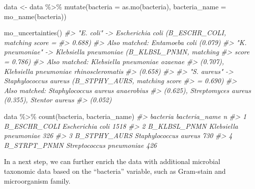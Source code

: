 \documentclass[
]{book}
\newenvironment{Shaded}{\begin{snugshade}}{\end{snugshade}}
\newcommand{\AttributeTok}[1]{\textcolor[rgb]{0.77,0.63,0.00}{#1}}
\newcommand{\CommentTok}[1]{\textcolor[rgb]{0.56,0.35,0.01}{\textit{#1}}}
\newcommand{\FunctionTok}[1]{\textcolor[rgb]{0.00,0.00,0.00}{#1}}
\newcommand{\NormalTok}[1]{#1}
\newcommand{\OtherTok}[1]{\textcolor[rgb]{0.56,0.35,0.01}{#1}}
\newcommand{\SpecialCharTok}[1]{\textcolor[rgb]{0.00,0.00,0.00}{#1}}
\begin{document}
\begin{Shaded}
\begin{Highlighting}[]
\NormalTok{data }\OtherTok{\textless{}{-}}\NormalTok{ data }\SpecialCharTok{\%\textgreater{}\%}
  \FunctionTok{mutate}\NormalTok{(}\AttributeTok{bacteria =} \FunctionTok{as.mo}\NormalTok{(bacteria),}
         \AttributeTok{bacteria\_name =} \FunctionTok{mo\_name}\NormalTok{(bacteria))}

\FunctionTok{mo\_uncertainties}\NormalTok{()}
\CommentTok{\#\textgreater{} "E. coli" {-}\textgreater{} Escherichia coli (B\_ESCHR\_COLI, matching score =}
\CommentTok{\#\textgreater{}              0.688)}
\CommentTok{\#\textgreater{}              Also matched: Entamoeba coli (0.079)}
\CommentTok{\#\textgreater{} "K. pneumoniae" {-}\textgreater{} Klebsiella pneumoniae (B\_KLBSL\_PNMN, matching}
\CommentTok{\#\textgreater{}                    score = 0.786)}
\CommentTok{\#\textgreater{}                    Also matched: Klebsiella pneumoniae ozaenae}
\CommentTok{\#\textgreater{}                    (0.707), Klebsiella pneumoniae rhinoscleromatis}
\CommentTok{\#\textgreater{}                    (0.658)}
\CommentTok{\#\textgreater{} }
\CommentTok{\#\textgreater{} "S. aureus" {-}\textgreater{} Staphylococcus aureus (B\_STPHY\_AURS, matching score}
\CommentTok{\#\textgreater{}                = 0.690)}
\CommentTok{\#\textgreater{}                Also matched: Staphylococcus aureus anaerobius}
\CommentTok{\#\textgreater{}                (0.625), Streptomyces aureus (0.355), Stentor aureus}
\CommentTok{\#\textgreater{}                (0.052)}

\NormalTok{data }\SpecialCharTok{\%\textgreater{}\%}
  \FunctionTok{count}\NormalTok{(bacteria, bacteria\_name)}
\CommentTok{\#\textgreater{}       bacteria            bacteria\_name    n}
\CommentTok{\#\textgreater{} 1 B\_ESCHR\_COLI         Escherichia coli 1518}
\CommentTok{\#\textgreater{} 2 B\_KLBSL\_PNMN    Klebsiella pneumoniae  326}
\CommentTok{\#\textgreater{} 3 B\_STPHY\_AURS    Staphylococcus aureus  730}
\CommentTok{\#\textgreater{} 4 B\_STRPT\_PNMN Streptococcus pneumoniae  426}
\end{Highlighting}
\end{Shaded}

In a next step, we can further enrich the data with additional microbial taxonomic data based on the ``bacteria'' variable, such as Gram-stain and microorganism family.
\end{document}
